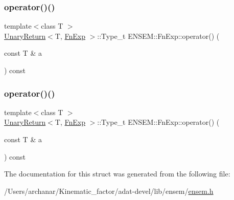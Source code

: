 \mbox{\label{structENSEM_1_1FnExp_a10f95f4422549fc30c1eacde6618fdcf}} 
\subsubsection{\texorpdfstring{operator()()}{operator()()}\hspace{0.1cm}{\footnotesize\ttfamily [2/3]}}
{\footnotesize\ttfamily template$<$class T $>$ \\
\mbox{\hyperlink{structENSEM_1_1UnaryReturn}{Unary\+Return}}$<$T, \mbox{\hyperlink{structENSEM_1_1FnExp}{Fn\+Exp}} $>$\+::Type\+\_\+t E\+N\+S\+E\+M\+::\+Fn\+Exp\+::operator() (\begin{DoxyParamCaption}\item[{const T \&}]{a }\end{DoxyParamCaption}) const\hspace{0.3cm}{\ttfamily [inline]}}

\mbox{\label{structENSEM_1_1FnExp_a10f95f4422549fc30c1eacde6618fdcf}} 
\subsubsection{\texorpdfstring{operator()()}{operator()()}\hspace{0.1cm}{\footnotesize\ttfamily [3/3]}}
{\footnotesize\ttfamily template$<$class T $>$ \\
\mbox{\hyperlink{structENSEM_1_1UnaryReturn}{Unary\+Return}}$<$T, \mbox{\hyperlink{structENSEM_1_1FnExp}{Fn\+Exp}} $>$\+::Type\+\_\+t E\+N\+S\+E\+M\+::\+Fn\+Exp\+::operator() (\begin{DoxyParamCaption}\item[{const T \&}]{a }\end{DoxyParamCaption}) const\hspace{0.3cm}{\ttfamily [inline]}}



The documentation for this struct was generated from the following file\+:\begin{DoxyCompactItemize}
\item 
/\+Users/archanar/\+Kinematic\+\_\+factor/adat-\/devel/lib/ensem/\mbox{\hyperlink{adat-devel_2lib_2ensem_2ensem_8h}{ensem.\+h}}\end{DoxyCompactItemize}
